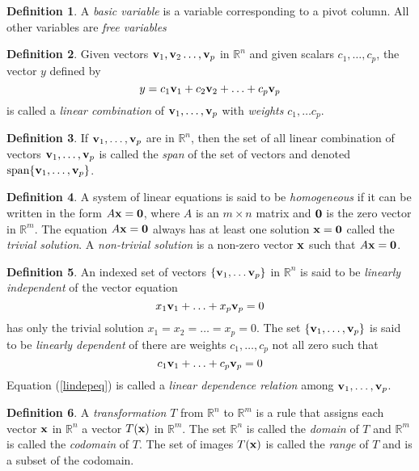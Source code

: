 \documentclass[12pt,letterpaper]{article}
\newcommand{\rr}{\mathbb R}     %
\renewcommand{\v}{{\bf v}}
\newcommand{\x}{{\bf x}}
\newcommand{\0}{{\bf 0}}
\theoremstyle{plain}
\theoremstyle{definition}
\newtheorem{definition}{Definition}
\begin{document}
\begin{definition} A \emph{basic variable} is a variable corresponding to a pivot column. All other variables are \emph{free variables}
\end{definition}

\begin{definition} Given vectors $\v_1,\v_2\ldots,  \v_p$ in $\mathbb{R}^n$ and given scalars $c_1,\ldots,c_p$, the vector $y$ defined by 
\[y=c_1\v_1+c_2\v_2+\ldots+c_p\v_p\]
is called a \emph{linear combination} of $\v_1,\ldots,\v_p$ with \emph{weights} $c_1,\ldots c_p$. 
\end{definition}
\begin{definition} If $\v_1, \ldots, \v_p$ are in $\mathbb{R}^n$, then the set of all linear combination of vectors $\v_1, \ldots, \v_p$ is called the \emph{span} of the set of vectors and denoted $\text{span}\{\v_1,\ldots, \v_p\}$.
\end{definition}
\begin{definition}
A system of linear equations is said to be \emph{homogeneous} if it can be written in the form $A\x={\bf 0}$, where $A$ is an $m\times n$ matrix and ${\bf 0}$ is the zero vector in $\mathbb{R}^m$. The equation $A\x={\bf 0} $ always has at least one solution $\x={\bf 0}$ called the \emph{trivial solution}. A \emph{non-trivial solution} is a non-zero vector $\x$ such that $A\x={\bf 0}$.
\end{definition}
\begin{definition} An indexed set of vectors $\{\v_1,\ldots \v_p\}$ in $\mathbb{R}^n$ is said to be \emph{linearly independent} of the vector equation 
\[x_1\v_1+\ldots +x_p\v_p=0\]
has only the trivial solution $x_1=x_2=\ldots =x_p=0$. The set $\{\v_1,\ldots, \v_p\}$ is said to be \emph{linearly dependent} of there are weights $c_1, \ldots, c_p$ not all zero such that 
\begin{equation}\label{lindepeq}c_1\v_1+\ldots +c_p\v_p=0 \end{equation}
Equation (\ref{lindepeq}) is called a \emph{linear dependence relation} among $\v_1, \ldots, \v_p$. 
\end{definition}
\begin{definition} A \emph{transformation} $T$ from $\mathbb{R}^n$ to $\mathbb{R}^m$ is a rule that assigns each vector $\x$ in $\mathbb{R}^n$ a vector $T(\x)$ in $\mathbb{R}^m$. The set $\rr^n$ is called the \emph{domain} of $T$ and $\rr^m$ is called the \emph{codomain} of $T$. The set of images $T(\x)$ is called the \emph{range} of $T$ and is a subset of the codomain.
\end{definition}
\end{document}
